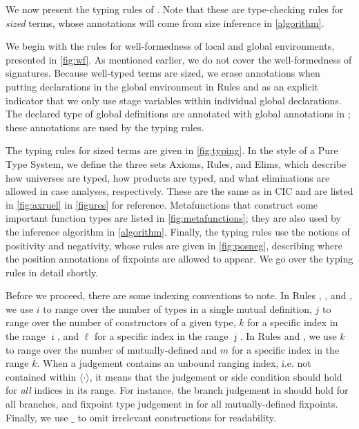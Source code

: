 \documentclass[sigplan,10pt,anonymous,review]{acmart}
\begin{document}








We now present the typing rules of \lang. Note that these are type-checking rules for \textit{sized} terms, whose annotations will come from size inference in \autoref{algorithm}.

We begin with the rules for well-formedness of local and global environments, presented in \autoref{fig:wf}. As mentioned earlier, we do not cover the well-formedness of signatures. Because well-typed terms are sized, we erase annotations when putting declarations in the global environment in Rules  and  as an explicit indicator that we only use stage variables within individual global declarations. The declared type of global definitions are annotated with global annotations in ; these annotations are used by the typing rules.

The typing rules for sized terms are given in \autoref{fig:typing}. In the style of a Pure Type System, we define the three sets Axioms, Rules, and Elims, which describe how universes are typed, how products are typed, and what eliminations are allowed in case analyses, respectively. These are the same as in CIC and are listed in \autoref{fig:axruel} in \autoref{figures} for reference. Metafunctions that construct some important function types are listed in \autoref{fig:metafunctions}; they are also used by the inference algorithm in \autoref{algorithm}. Finally, the typing rules use the notions of positivity and negativity, whose rules are given in \autoref{fig:posneg}, describing where the position annotations of fixpoints are allowed to appear. We go over the typing rules in detail shortly.

Before we proceed, there are some indexing conventions to note. In Rules , , and , we use $i$ to range over the number of \coinductive types in a single mutual \coinductive definition, $j$ to range over the number of constructors of a given \coinductive type, $k$ for a specific index in the range $\overline{\imath}$, and $\ell$ for a specific index in the range $\overline{\jmath}$. In Rules  and , we use $k$ to range over the number of mutually-defined \cofixpoints and $m$ for a specific index in the range $\overline{k}$. When a judgement contains an unbound ranging index, i.e. not contained within $\langle \cdot \rangle$, it means that the judgement or side condition should hold for \textit{all} indices in its range. For instance, the branch judgement in  should hold for all branches, and fixpoint type judgement in  for all mutually-defined fixpoints. Finally, we use $\_$ to omit irrelevant constructions for readability.
\end{document}

